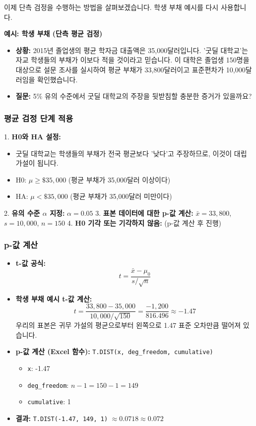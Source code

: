 \documentclass[11pt,a4paper]{book}
\theoremstyle{definition}
\begin{document}
이제 단측 검정을 수행하는 방법을 살펴보겠습니다. 학생 부채 예시를 다시 사용합니다.

\begin{examplebox}
\textbf{예시: 학생 부채 (단측 평균 검정)}
\begin{itemize}
    \item \textbf{상황:} 2015년 졸업생의 평균 학자금 대출액은 35,000달러입니다. '굿딜 대학교'는 자교 학생들의 부채가 이보다 적을 것이라고 믿습니다. 이 대학은 졸업생 150명을 대상으로 설문 조사를 실시하여 평균 부채가 33,800달러이고 표준편차가 10,000달러임을 확인했습니다.
    \item \textbf{질문:} 5\% 유의 수준에서 굿딜 대학교의 주장을 뒷받침할 충분한 증거가 있을까요?
\end{itemize}
\end{examplebox}

\subsubsection*{평균 검정 단계 적용}

1.  \textbf{H0와 HA 설정:}
    \begin{itemize}
        \item 굿딜 대학교는 학생들의 부채가 전국 평균보다 '낮다'고 주장하므로, 이것이 대립 가설이 됩니다.
        \item H0: $\mu \ge \$35,000$ (평균 부채가 35,000달러 이상이다)
        \item HA: $\mu < \$35,000$ (평균 부채가 35,000달러 미만이다)
    \end{itemize}
2.  \textbf{유의 수준 $\alpha$ 지정:} $\alpha = 0.05$
3.  \textbf{표본 데이터에 대한 p-값 계산:} $\bar{x} = 33,800$, $s = 10,000$, $n = 150$
4.  \textbf{H0 기각 또는 기각하지 않음:} (p-값 계산 후 진행)

\subsubsection*{p-값 계산}

\begin{itemize}
    \item \textbf{t-값 공식:}
    \[ t = \frac{\bar{x} - \mu_0}{s / \sqrt{n}} \]
    \item \textbf{학생 부채 예시 t-값 계산:}
    \[ t = \frac{33,800 - 35,000}{10,000 / \sqrt{150}} = \frac{-1,200}{816.496} \approx -1.47 \]
    우리의 표본은 귀무 가설의 평균으로부터 왼쪽으로 1.47 표준 오차만큼 떨어져 있습니다.
    \item \textbf{p-값 계산 (Excel 함수):} \texttt{T.DIST(x, deg\_freedom, cumulative)}
        \begin{itemize}
            \item \texttt{x}: -1.47
            \item \texttt{deg\_freedom}: $n-1 = 150-1 = 149$
            \item \texttt{cumulative}: 1
        \end{itemize}
    \item \textbf{결과:} \texttt{T.DIST(-1.47, 149, 1)} $\approx 0.0718 \approx 0.072$
\end{itemize}
\end{document}
